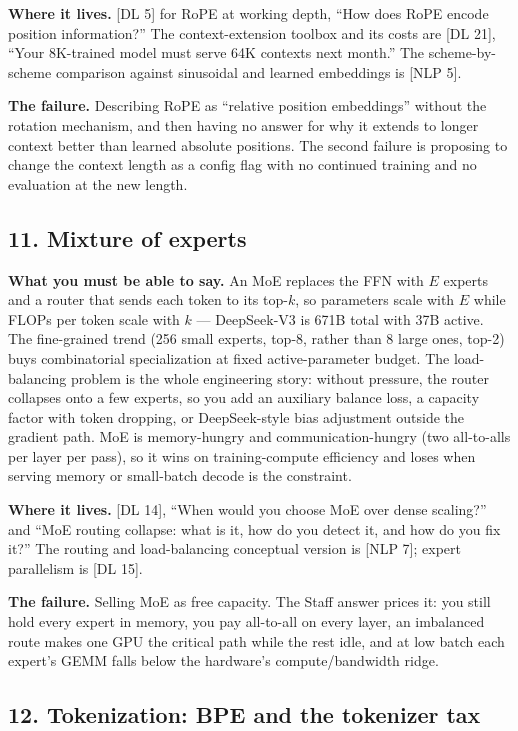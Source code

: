 \textbf{Where it lives.} [DL 5] for RoPE at working depth, ``How does RoPE encode position information?'' The context-extension toolbox and its costs are [DL 21], ``Your 8K-trained model must serve 64K contexts next month.'' The scheme-by-scheme comparison against sinusoidal and learned embeddings is [NLP 5].

\textbf{The failure.} Describing RoPE as ``relative position embeddings'' without the rotation mechanism, and then having no answer for why it extends to longer context better than learned absolute positions. The second failure is proposing to change the context length as a config flag with no continued training and no evaluation at the new length.

\subsection*{11. Mixture of experts}

\textbf{What you must be able to say.} An MoE replaces the FFN with $E$ experts and a router that sends each token to its top-$k$, so parameters scale with $E$ while FLOPs per token scale with $k$ --- DeepSeek-V3 is 671B total with 37B active. The fine-grained trend (256 small experts, top-8, rather than 8 large ones, top-2) buys combinatorial specialization at fixed active-parameter budget. The load-balancing problem is the whole engineering story: without pressure, the router collapses onto a few experts, so you add an auxiliary balance loss, a capacity factor with token dropping, or DeepSeek-style bias adjustment outside the gradient path. MoE is memory-hungry and communication-hungry (two all-to-alls per layer per pass), so it wins on training-compute efficiency and loses when serving memory or small-batch decode is the constraint.

\textbf{Where it lives.} [DL 14], ``When would you choose MoE over dense scaling?'' and ``MoE routing collapse: what is it, how do you detect it, and how do you fix it?'' The routing and load-balancing conceptual version is [NLP 7]; expert parallelism is [DL 15].

\textbf{The failure.} Selling MoE as free capacity. The Staff answer prices it: you still hold every expert in memory, you pay all-to-all on every layer, an imbalanced route makes one GPU the critical path while the rest idle, and at low batch each expert's GEMM falls below the hardware's compute/bandwidth ridge.

\subsection*{12. Tokenization: BPE and the tokenizer tax}

